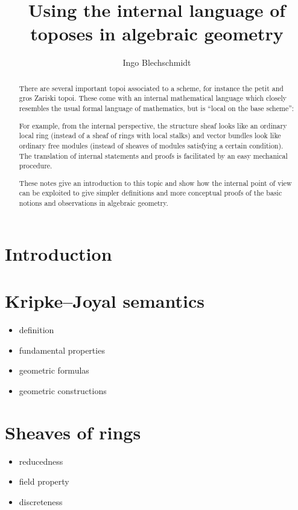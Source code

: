 \documentclass{amsart}
\title{Using the internal language of toposes in algebraic geometry}
\author{Ingo Blechschmidt}
\begin{document}
\maketitle

\begin{abstract}
  There are several important topoi associated to a scheme, for instance the
  petit and gros Zariski topoi. These come with an internal mathematical language
  which closely resembles the usual formal language of mathematics, but is ``local
  on the base scheme'':

  For example, from the internal perspective, the structure sheaf looks like an
  ordinary local ring (instead of a sheaf of rings with local stalks) and vector
  bundles look like ordinary free modules (instead of sheaves of modules
  satisfying a certain condition). The translation of internal statements and
  proofs is facilitated by an easy mechanical procedure.

  These notes give an introduction to this topic and show how the internal
  point of view can be exploited to give simpler definitions and more conceptual
  proofs of the basic notions and observations in algebraic geometry.
\end{abstract}

\tableofcontents

\section{Introduction}

\section{Kripke--Joyal semantics}
\begin{itemize}
\item definition
\item fundamental properties
\item geometric formulas
\item geometric constructions
\end{itemize}

\section{Sheaves of rings}
\begin{itemize}
\item reducedness
\item field property
\item discreteness
\end{itemize}
\end{document}
